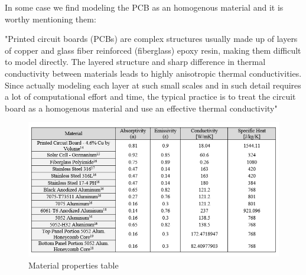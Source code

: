 \documentclass[final]{cubedoc}
\begin{document}




In some case we find modeling the PCB as an homogenous material and it is worthy mentioning them:


"Printed circuit boards (PCBs) are complex structures usually made up of layers of copper and glass fiber reinforced (fiberglass) epoxy resin, making them difficult to model directly. The layered structure and sharp difference in thermal conductivity between materials leads to highly anisotropic thermal conductivities. Since actually modeling each layer at such small scales and in such detail requires a lot of computational effort and time, the typical practice is to treat the circuit board as a homogenous material and use an effective thermal conductivity"~\cite{peake2014cubesat}

\begin{figure}[h!]
    \centering
    \includegraphics[keepaspectratio, height=0.3\textheight, width=\textwidth]{docs/material_properties_table.png}
    \caption{Material properties table ~\cite[p.115]{zotero-47}}
    \label{fig:my_label}
\end{figure}
\end{document}
